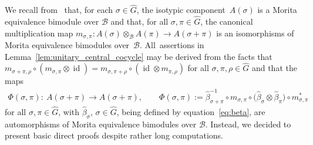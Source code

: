 \documentclass[pdftex]{sigma}
\numberwithin{equation}{section}
\newcommand*{\tensor}{\otimes}		%
\DeclareMathOperator{\id}{id}		%
\newcommand*{\alg}{\mathcal}		%
\newcommand*{\aB}{\alg{B}} 			%
\begin{document}
\begin{Remark}We recall from~\cite[Corollary~3.11]{SchWa17a} that, for each $\sigma \in \hat G$, the isotypic component~$A(\sigma)$ is a Morita equivalence bimodule over $\aB$ and that, for all $\sigma, \pi \in \hat G$, the canonical multiplication map $m_{\sigma, \pi}\colon A(\sigma) \tensor_\aB A(\pi) \to A(\sigma + \pi)$ is an isomorphisms of Morita equivalence bimodules over~$\aB$.
	All~assertions in Lemma~\ref{lem:unitary_central_cocycle} may be derived from the facts that $m_{\sigma + \pi, \rho} \circ (m_{\sigma, \pi} \tensor \id) = m_{\sigma, \pi + \rho} \circ (\id \tensor m_{\pi, \rho})$ for all $\sigma,\pi,\rho \in \hat G$ and that the maps
	\begin{gather*}
		\Phi(\sigma,\pi)\colon \ A(\sigma + \pi) \to A(\sigma + \pi),
		\qquad
		\Phi(\sigma, \pi) := \hat\beta_{\sigma+ \pi}^{-1} \circ m_{\sigma, \pi} \circ \big(\hat\beta_\sigma \tensor \hat\beta_\pi\big) \circ m_{\sigma, \pi}^*
	\end{gather*}
	for all $\sigma, \pi \in \hat G$, with $\hat \beta_\sigma$, $\sigma \in \hat G$, being defined by equation~\eqref{eq:beta}, are automorphisms of Morita equivalence bimodules over $\aB$.
	Instead, we decided to present basic direct proofs despite rather long computations.
\end{Remark}
\end{document}
